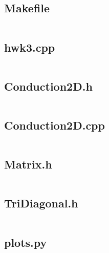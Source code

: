 \documentclass{article}
\begin{document}
\subsection*{Makefile}
\inputminted[fontsize=\footnotesize]{Makefile}{../Makefile}

\subsection*{hwk3.cpp}
\inputminted[fontsize=\footnotesize]{c++}{../hwk3.cpp}

\subsection*{Conduction2D.h}
\inputminted[fontsize=\footnotesize]{c++}{../Conduction2D.h}

\subsection*{Conduction2D.cpp}
\inputminted[fontsize=\footnotesize]{c++}{../Conduction2D.cpp}

\subsection*{Matrix.h}
\inputminted[fontsize=\footnotesize]{c++}{../Matrix.h}

\subsection*{TriDiagonal.h}
\inputminted[fontsize=\footnotesize]{c++}{../TriDiagonal.h}

\subsection*{plots.py}
\inputminted[fontsize=\footnotesize]{python}{../plots.py}
\end{document}
